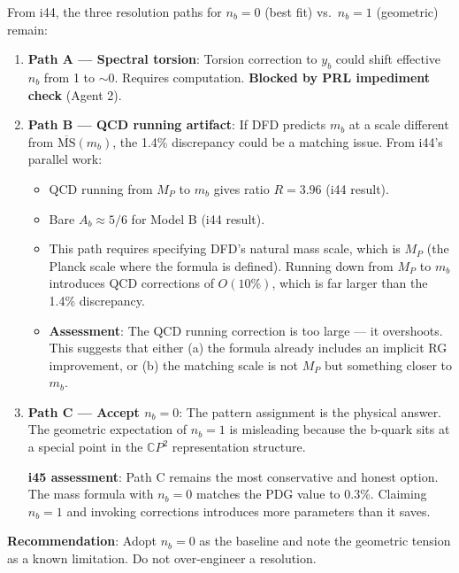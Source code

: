 \documentclass[11pt,a4paper]{article}
\newcommand{\CP}{\mathbb{C}P}
\begin{document}
\begin{tcolorbox}[colback=yellow!5!white, colframe=yellow!60!black,
  title={b-QUARK: Three Parallel Paths, None Closed}]

From i44, the three resolution paths for $n_b = 0$ (best fit) vs.\ $n_b = 1$ (geometric) remain:

\begin{enumerate}
\item \textbf{Path A --- Spectral torsion}: Torsion correction to $y_b$ could shift effective $n_b$ from 1 to $\sim 0$. Requires computation. \textbf{Blocked by PRL impediment check} (Agent 2).

\item \textbf{Path B --- QCD running artifact}: If DFD predicts $m_b$ at a scale different from $\overline{\text{MS}}(m_b)$, the 1.4\% discrepancy could be a matching issue. From i44's parallel work:
\begin{itemize}
\item QCD running from $M_P$ to $m_b$ gives ratio $R = 3.96$ (i44 result).
\item Bare $A_b \approx 5/6$ for Model B (i44 result).
\item This path requires specifying DFD's natural mass scale, which is $M_P$ (the Planck scale where the formula is defined). Running down from $M_P$ to $m_b$ introduces QCD corrections of $O(10\%)$, which is far larger than the 1.4\% discrepancy.
\item \textbf{Assessment}: The QCD running correction is too large --- it overshoots. This suggests that either (a) the formula already includes an implicit RG improvement, or (b) the matching scale is not $M_P$ but something closer to $m_b$.
\end{itemize}

\item \textbf{Path C --- Accept $n_b = 0$}: The pattern assignment is the physical answer. The geometric expectation of $n_b = 1$ is misleading because the b-quark sits at a special point in the $\CP^2$ representation structure.

\textbf{i45 assessment}: Path C remains the most conservative and honest option. The mass formula with $n_b = 0$ matches the PDG value to 0.3\%. Claiming $n_b = 1$ and invoking corrections introduces more parameters than it saves.
\end{enumerate}

\textbf{Recommendation}: Adopt $n_b = 0$ as the baseline and note the geometric tension as a known limitation. Do not over-engineer a resolution.
\end{tcolorbox}
\end{document}
